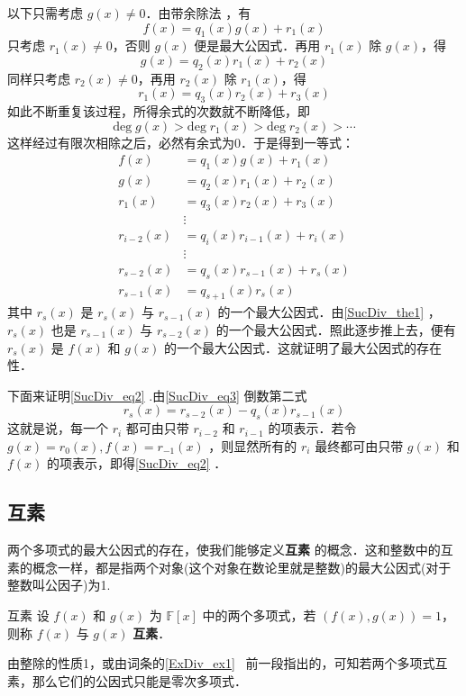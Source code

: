 以下只需考虑 $g(x)\neq 0$．由带余除法 ，有
\begin{equation}
f(x)=q_1(x)g(x)+r_1(x)
\end{equation}
只考虑 $r_1(x)\neq 0$，否则 $g(x)$ 便是最大公因式．再用 $r_1(x)$ 除 $g(x)$，得
\begin{equation}
g(x)=q_2(x)r_1(x)+r_2(x)
\end{equation}
同样只考虑 $r_2(x)\neq0$，再用 $r_2(x)$ 除 $r_1(x)$，得
\begin{equation}
r_1(x)=q_3(x)r_2(x)+r_3(x)
\end{equation}
如此不断重复该过程，所得余式的次数就不断降低，即
\begin{equation}
\mathrm{deg}\;g(x)>\mathrm{deg}\;r_1(x)>\mathrm{deg}\;r_2(x)>\cdots
\end{equation}
这样经过有限次相除之后，必然有余式为0．于是得到一等式：
\begin{equation}\label{SucDiv_eq3}
\begin{aligned}
f(x)&=q_1(x)g(x)+r_1(x)\\
g(x)&=q_2(x)r_1(x)+r_2(x)\\
r_1(x)&=q_3(x)r_2(x)+r_3(x)\\
&\vdots\\
r_{i-2}(x)&=q_i(x)r_{i-1}(x)+r_i(x)\\
&\vdots\\
r_{s-2}(x)&=q_s(x)r_{s-1}(x)+r_s(x)\\
r_{s-1}(x)&=q_{s+1}(x)r_s(x)
\end{aligned}
\end{equation}
其中 $r_s(x)$ 是 $r_s(x)$ 与 $r_{s-1}(x)$ 的一个最大公因式．由\autoref{SucDiv_the1} ，$r_s(x)$ 也是 $r_{s-1}(x)$ 与 $r_{s-2}(x)$ 的一个最大公因式．照此逐步推上去，便有 $r_s(x)$ 是 $f(x)$ 和 $g(x)$ 的一个最大公因式．这就证明了最大公因式的存在性．

下面来证明\autoref{SucDiv_eq2} .由\autoref{SucDiv_eq3} 倒数第二式
\begin{equation}
r_s(x)=r_{s-2}(x)-q_s(x)r_{s-1}(x)
\end{equation}
这就是说，每一个 $r_i$ 都可由只带 $r_{i-2}$ 和 $r_{i-1}$ 的项表示．若令 $g(x)=r_0(x),f(x)=r_{-1}(x)$ ，则显然所有的 $r_i$ 最终都可由只带 $g(x)$ 和 $f(x)$ 的项表示，即得\autoref{SucDiv_eq2} ．
\subsection{互素}
两个多项式的最大公因式的存在，使我们能够定义\textbf{互素} 的概念．这和整数中的互素的概念一样，都是指两个对象(这个对象在数论里就是整数)的最大公因式(对于整数叫公因子)为1.
\begin{definition}{互素}
设 $f(x)$ 和 $g(x)$ 为 $\mathbb{F}[x]$ 中的两个多项式，若 $(f(x),g(x))=1$，则称 $f(x)$ 与 $g(x)$ \textbf{互素}．
\end{definition}
由整除的性质1，或由词条的\autoref{ExDiv_ex1}~ 前一段指出的，可知若两个多项式互素，那么它们的公因式只能是零次多项式．

